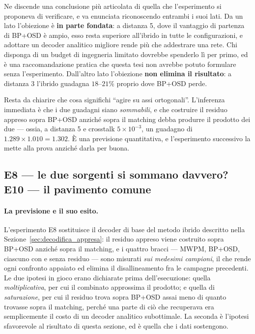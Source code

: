 Ne discende una conclusione più articolata di quella che l'esperimento si proponeva di verificare, e va enunciata riconoscendo entrambi i suoi lati. Da un lato l'obiezione è \textbf{in parte fondata}: a distanza 5, dove il vantaggio di partenza di BP+OSD è ampio, esso resta superiore all'ibrido in tutte le configurazioni, e adottare un decoder analitico migliore rende più che addestrare una rete. Chi disponga di un budget di ingegneria limitato dovrebbe spenderlo lì per primo, ed è una raccomandazione pratica che questa tesi non avrebbe potuto formulare senza l'esperimento. Dall'altro lato l'obiezione \textbf{non elimina il risultato}: a distanza 3 l'ibrido guadagna $18$--$21\%$ proprio dove BP+OSD perde.

Resta da chiarire che cosa significhi ``agire su assi ortogonali''. L'inferenza immediata è che i due guadagni siano \emph{sommabili}, e che costruire il residuo appreso sopra BP+OSD anziché sopra il matching debba produrre il prodotto dei due --- ossia, a distanza 5 e crosstalk $5\times10^{-3}$, un guadagno di $1.289 \times 1.010 = 1.302$. È una previsione quantitativa, e l'esperimento successivo la mette alla prova anziché darla per buona.

\subsection[E8/E10 --- rumori combinati e pavimento comune]{E8 --- le due sorgenti si sommano davvero? E10 --- il pavimento comune}
\label{subsec:neural_pavimento}

\paragraph{La previsione e il suo esito.}
L'esperimento E8 sostituisce il decoder di base del metodo ibrido descritto
nella Sezione~\ref{sec:decodifica_appresa}: il residuo appreso viene costruito
sopra BP+OSD anziché sopra il matching, e i quattro bracci --- \ac{MWPM},
BP+OSD, ciascuno con e senza residuo --- sono misurati \emph{sui medesimi
campioni}, il che rende ogni confronto appaiato ed elimina il disallineamento
fra le campagne precedenti. Le due ipotesi in gioco erano dichiarate prima
dell'esecuzione: quella \emph{moltiplicativa}, per cui il combinato approssima
il prodotto; e quella di \emph{saturazione}, per cui il residuo trova sopra
BP+OSD assai meno di quanto trovasse sopra il matching, perché una parte di ciò
che recuperava era semplicemente il costo di un decoder analitico subottimale.
La seconda è l'ipotesi sfavorevole al risultato di questa sezione, ed è quella
che i dati sostengono.

